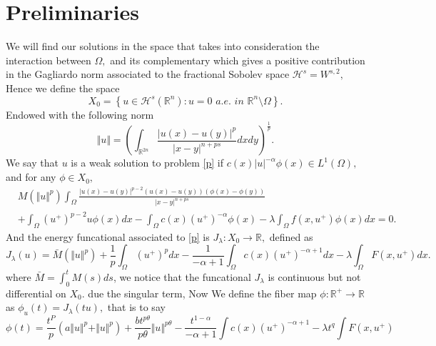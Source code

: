 \documentclass[10pt,twoside,reqno,centertags,draft]{amsart}
\begin{document}
\section{Preliminaries}
We will find our solutions in the space that takes into consideration the interaction between $ \Omega,$ and its complementary which gives a positive contribution in the 
Gagliardo norm associated to the fractional Sobolev space $ \mathcal{H}^{s} = W^{s,2},$  Hence we define the space 
\begin{equation}
X_0 = \left\lbrace  u \in \mathcal{H}^{s}(\mathbb{R}^n) : u = 0 \,\, \textit{a.e.} \,\, \textit{in} \,\, \mathbb{R}^n \setminus \Omega \right\rbrace.
\end{equation}
Endowed with the following norm
\begin{equation}
\Vert u \Vert = \left( \int_{\mathbb{R}^{2n}} \frac{\vert u(x) - u(y)\vert^{p}}{\vert x - y \vert^{n+ ps}}dxdy \right)^{\frac{1}{p}}.
\end{equation}
We say that $ u$ is a weak solution to problem \ref{p} if  $ c(x) \vert u \vert^{-\alpha} \phi(x) \in L^{1}(\Omega),$ and for any $ \phi \in X_0,$
\begin{equation}\label{weak}
\begin{aligned}
& M(\Vert u \Vert^{p}) \int_{\Omega} \frac{\vert u(x) - u(y) \vert^{p-2}(u(x) - u(y))(\phi(x) - \phi(y))}{\vert x-y \vert^{n + ps}}\\
& + \int_{\Omega}  (u^+)^{p-2} u \phi(x) dx  - \int_{\Omega} c(x) (u^+)^{-\alpha} \phi(x) - 
\lambda \int_{\Omega} f(x,u^+) \phi(x)dx = 0.
\end{aligned}
\end{equation}
And the energy funcational associated to \ref{p} is $ J_{\lambda} : X_0 \longrightarrow \mathbb{R},$ defined as
\begin{equation}\label{j}
J_{\lambda}(u) = \bar{M}(\Vert u \Vert^{p}) + \frac{1}{p}\int_{\Omega}(u^+)^{p}dx  - \frac{1}{-\alpha+1} \int_{\Omega}c(x)(u^+)^{-\alpha+1} dx - \lambda \int_{\Omega} F(x,u^+) dx .
\end{equation}
where $ \bar{M} =\int_{0}^{t}M(s)ds$, we notice that the funcational $ J_{\lambda}$ is continuous but not differential on $ X_0.$ due the singular term, Now
We define the fiber map $ \phi : \mathbb{R}^+ \longrightarrow \mathbb{R}$ as $ \phi_{u}(t) = J_{\lambda}(tu),$ that is to say
\begin{equation*}
\phi(t) =  \frac{t^P}{p} \left(a \Vert u \Vert^p + \Vert u \Vert^{p}\right) + \frac{b t^{p \theta}}{p \theta}\Vert u \Vert^{p \theta}  -\frac{t^{1-\alpha}}{-\alpha+1} \int c(x)(u^+)^{-\alpha+1} - \lambda t^q \int F(x,u^+) 
\end{equation*}
\end{document}
